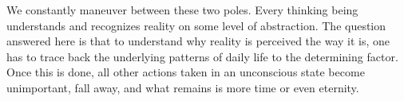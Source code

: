 \documentclass{article}
\begin{document}
We constantly maneuver between these two poles. Every thinking being understands and recognizes reality on some level of abstraction. The question answered here is that to understand why reality is perceived the way it is, one has to trace back the underlying patterns of daily life to the determining factor. Once this is done, all other actions taken in an unconscious state become unimportant, fall away, and what remains is more time or even eternity.
\end{document}

